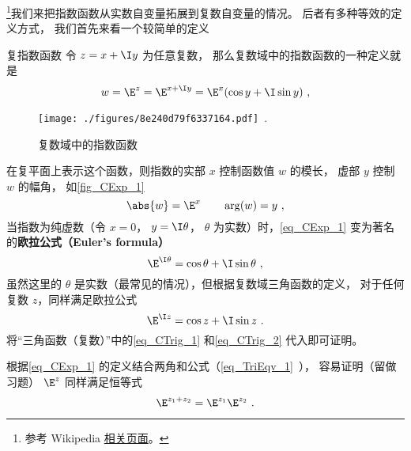 
\begin{issues}
\issueTODO
\end{issues}



\footnote{参考 Wikipedia \href{https://en.wikipedia.org/wiki/Euler's_formula}{相关页面}。}我们来把指数函数从实数自变量拓展到复数自变量的情况。 后者有多种等效的定义方式， 我们首先来看一个较简单的定义

\begin{definition}{复指数函数}
令 $z = x + \I y$ 为任意复数， 那么复数域中的指数函数的一种定义就是
\begin{equation}\label{eq_CExp_1}
w = \E^z = \E^{x + \I y} = \E^x(\cos y + \I\sin y)~,
\end{equation}
\end{definition}

\begin{figure}[ht]
\centering
\texttt{[image: ./figures/8e240d79f6337164.pdf]}~.
\caption{复数域中的指数函数} \label{fig_CExp_1}
\end{figure}

在复平面上表示这个函数，则指数的实部 $x$ 控制函数值 $w$ 的模长， 虚部 $y$ 控制 $w$ 的幅角， 如\autoref{fig_CExp_1}
 \begin{equation}
\abs{w} = \E^x \qquad \arg(w) = y~,
\end{equation}
当指数为纯虚数（令 $x = 0$， $y = \I\theta$， $\theta$ 为实数）时，\autoref{eq_CExp_1} 变为著名的\textbf{欧拉公式（Euler's formula）}
\begin{equation}\label{eq_CExp_2}
\E^{\I \theta} = \cos \theta + \I\sin \theta~,
\end{equation}
虽然这里的 $\theta$ 是实数（最常见的情况），但根据复数域三角函数的定义， 对于任何复数 $z$，同样满足欧拉公式
\begin{equation}
\E^{\I z} = \cos z + \I\sin z~.
\end{equation}
将“三角函数（复数）”中的\autoref{eq_CTrig_1} 和\autoref{eq_CTrig_2} 代入即可证明。

根据\autoref{eq_CExp_1} 的定义结合两角和公式（\autoref{eq_TriEqv_1}~）， 容易证明（留做习题） $\E^z$ 同样满足恒等式
\begin{equation}
\E^{z_1 + z_2} = \E^{z_1}\E^{z_2}~.
\end{equation}

